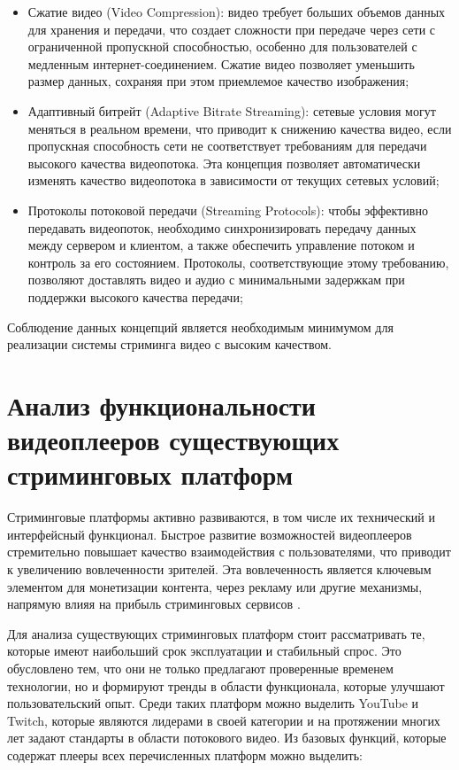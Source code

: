 	\begin{itemize}[label=$\bullet$]
		\item Сжатие видео (Video Compression): видео требует больших объемов данных для хранения и передачи, что создает сложности при передаче через сети с ограниченной пропускной способностью, особенно для пользователей с медленным интернет-соединением. Сжатие видео позволяет уменьшить размер данных, сохраняя при этом приемлемое качество изображения;
		\item Адаптивный битрейт (Adaptive Bitrate Streaming): сетевые условия могут меняться в реальном времени, что приводит к снижению качества видео, если пропускная способность сети не соответствует требованиям для передачи высокого качества видеопотока. Эта концепция позволяет автоматически изменять качество видеопотока в зависимости от текущих сетевых условий;
		\item Протоколы потоковой передачи (Streaming Protocols): чтобы эффективно передавать видеопоток, необходимо синхронизировать передачу данных между сервером и клиентом, а также обеспечить управление потоком и контроль за его состоянием. Протоколы, соответствующие этому требованию, позволяют доставлять видео и аудио с минимальными задержкам при поддержки высокого качества передачи;
	\end{itemize}

	Соблюдение данных концепций является необходимым минимумом для реализации системы стриминга видео с высоким качеством.

\section{Анализ функциональности видеоплееров существующих стриминговых платформ}
	Стриминговые платформы активно развиваются, в том числе их технический и интерфейсный функционал. Быстрое развитие возможностей видеоплееров стремительно повышает качество взаимодействия с пользователями, что приводит к увеличению вовлеченности зрителей. Эта вовлеченность является ключевым элементом для монетизации контента, через рекламу или другие механизмы, напрямую влияя на прибыль стриминговых сервисов \cite{xiaoShortVideoMarketing}.

	Для анализа существующих стриминговых платформ стоит рассматривать те, которые имеют наибольший срок эксплуатации и стабильный спрос. Это обусловлено тем, что они не только предлагают проверенные временем технологии, но и формируют тренды в области функционала, которые улучшают пользовательский опыт. Среди таких платформ можно выделить YouTube и Twitch, которые являются лидерами в своей категории и на протяжении многих лет задают стандарты в области потокового видео. Из базовых функций, которые содержат плееры всех перечисленных платформ можно выделить:
	
